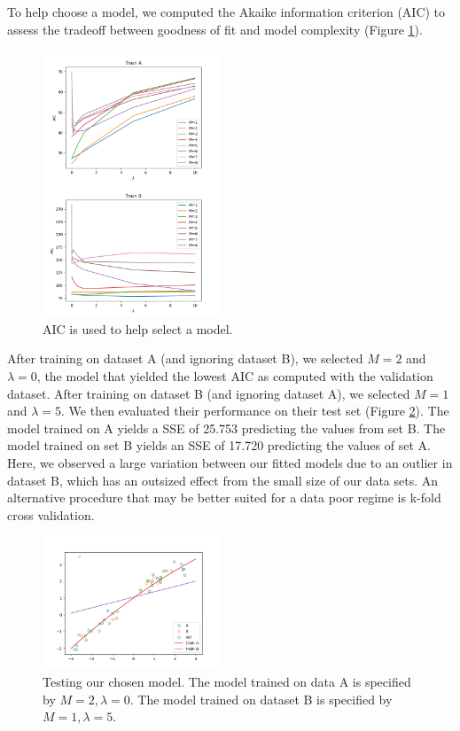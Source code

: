 \documentclass[10pt]{article}
\begin{document}
To help choose a model, we computed the Akaike information criterion (AIC) to assess the tradeoff between goodness of fit and model complexity (Figure \ref{fig:P3_AIC}). 

\begin{figure}
\caption{AIC is used to help select a model.}
\begin{center}
\includegraphics[width=200px]{P3_AIC}
\end{center}
\label{fig:P3_AIC}
\end{figure}

After training on dataset A (and ignoring dataset B), we selected $M=2$ and $\lambda=0$, the model that yielded the lowest AIC as computed with the validation dataset. After training on dataset B (and ignoring dataset A), we selected $M=1$ and $\lambda=5$. We then evaluated their performance on their test set (Figure \ref{fig:P3_test}). The model trained on A yields a SSE of 25.753 predicting the values from set B. The model trained on set B yields an SSE of 17.720 predicting the values of set A. Here, we observed a large variation between our fitted models due to an outlier in dataset B, which has an outsized effect from the small size of our data sets. An alternative procedure that may be better suited for a data poor regime is k-fold cross validation.

\begin{figure}
\caption{Testing our chosen model. The model trained on data A is specified by $M=2, \lambda=0$. The model trained on dataset B is specified by $M=1,\lambda=5$.}
\begin{center}
\includegraphics[width=200px]{P3_test}
\end{center}
\label{fig:P3_test}
\end{figure}
\end{document}
